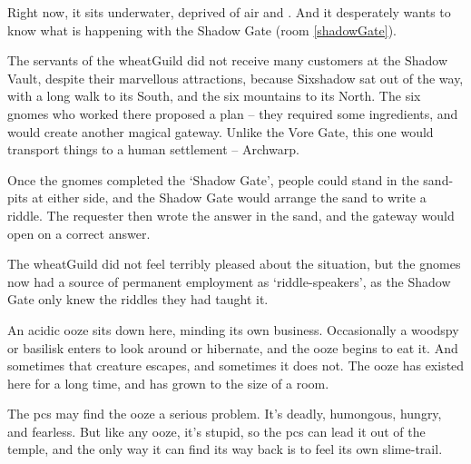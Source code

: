 \begin{multicols}{2}
Right now, it sits underwater, deprived of air and .
And it desperately wants to know what is happening with the Shadow Gate (room \vref{shadowGate}).



\begin{exampletext}
  The servants of the \gls{wheatGuild} did not receive many customers at the Shadow Vault, despite their marvellous attractions, because Sixshadow sat out of the way, with a long walk to its South, and the six mountains to its North.
  The six gnomes who worked there proposed a plan -- they required some \glspl{ingredient}, and would create another magical gateway.
  Unlike the Vore Gate, this one would transport things to a human settlement -- Archwarp.

  Once the gnomes completed the `Shadow Gate', people could stand in the sand-pits at either side, and the Shadow Gate would arrange the sand to write a riddle.
  The requester then wrote the answer in the sand, and the gateway would open on a correct answer.

  The \gls{wheatGuild} did not feel terribly pleased about the situation, but the gnomes now had a source of permanent employment as `riddle-speakers', as the Shadow Gate only knew the riddles they had taught it.
\end{exampletext}

An acidic ooze sits down here, minding its own business.
Occasionally a woodspy or basilisk enters to look around or hibernate, and the ooze begins to eat it.
And sometimes that creature escapes, and sometimes it does not.
The ooze has existed here for a long time, and has grown to the size of a room.


The \glspl{pc} may find the ooze a serious problem.
It's deadly, humongous, hungry, and fearless.
But like any ooze, it's stupid, so the \glspl{pc} can lead it out of the temple, and the only way it can find its way back is to feel its own slime-trail.



\end{multicols}
